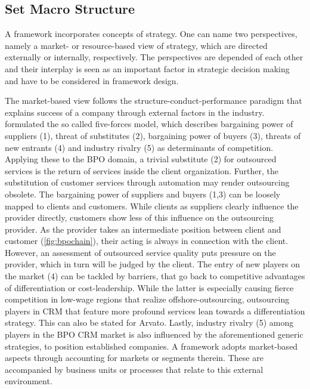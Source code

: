 	
	
	\subsection{Set Macro Structure}
	
	A framework incorporates concepts of strategy. One can name two perspectives, namely a market- or resource-based view of strategy, which are directed externally or internally, respectively. The perspectives are depended of each other and their interplay is seen as an important factor in strategic decision making and have to be considered in framework design. %
	
	The market-based view follows the structure-conduct-performance paradigm that explains success of a company through external factors in the industry. \cite{porter1980} formulated the so called five-forces model, which describes bargaining power of suppliers (1), threat of substitutes (2), bargaining power of buyers (3), threats of new entrants (4) and industry rivalry (5) as determinants of competition. Applying these to the BPO domain, a trivial substitute (2) for outsourced services is the return of services inside the client organization. Further, the substitution of customer services through automation may render outsourcing obsolete. The bargaining power of suppliers and buyers (1,3) can be loosely mapped to clients and customers. While clients as suppliers clearly influence the provider directly, customers show less of this influence on the outsourcing provider. As the provider takes an intermediate position between client and customer (\cf \Fig \ref{fig:bpochain}), their acting is always in connection with the client. However, an assessment of outsourced service quality puts pressure on the provider, which in turn will be judged by the client. The entry of new players on the market (4) can be tackled by barriers, that go back to competitive advantages of differentiation or cost-leadership. While the latter is especially causing fierce competition in low-wage regions that realize offshore-outsourcing, outsourcing players in CRM that feature more profound services lean towards a differentiation strategy. This can also be stated for Arvato. Lastly, industry rivalry (5) among players in the BPO CRM market is also influenced by the aforementioned generic strategies, to position established companies. A framework adopts market-based aspects through accounting for markets or segments therein. These are accompanied by business units or processes that relate to this external environment. 
	
